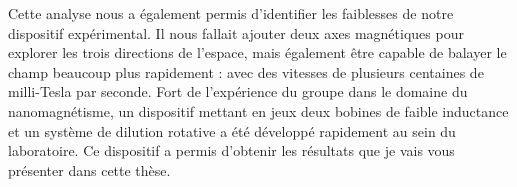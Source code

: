 Cette analyse nous a également permis d'identifier les faiblesses de notre dispositif expérimental. Il nous fallait ajouter deux axes magnétiques pour explorer les trois directions de l'espace, mais également être capable de balayer le champ beaucoup plus rapidement : avec des vitesses de plusieurs centaines de milli-Tesla par seconde. Fort de l'expérience du groupe dans le domaine du nanomagnétisme, un dispositif mettant en jeux deux bobines de faible inductance et un système de dilution rotative a été développé rapidement au sein du laboratoire. Ce dispositif a permis d'obtenir les résultats que je vais vous présenter dans cette thèse.

